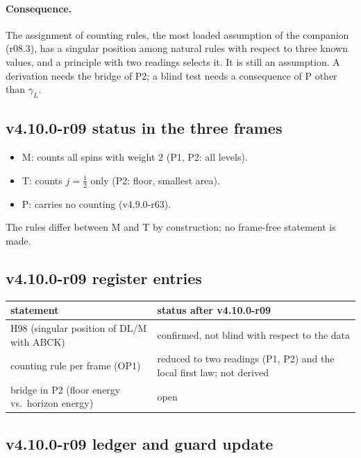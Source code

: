 \paragraph{Consequence.}
The assignment of counting rules, the most loaded assumption of the companion (r08.3), has a singular position among natural rules with respect to
three known values, and a principle with two readings selects it.  It is still an assumption.  A derivation needs the bridge of P2; a blind test needs a
consequence of P other than \(\gamma_L\).

\subsection*{v4.10.0-r09 status in the three frames}
\label{subsec:v4100-r09-frames}

\begin{itemize}[leftmargin=2em]
\item M: counts all spins with weight \(2\) (P1, P2: all levels).
\item T: counts \(j=\tfrac12\) only (P2: floor, smallest area).
\item P: carries no counting (v4.9.0-r63).
\end{itemize}
The rules differ between M and T by construction; no frame-free statement is made.

\subsection*{v4.10.0-r09 register entries}
\label{subsec:v4100-r09-register}

\begin{center}
\small
\begin{tabular}{@{}>{\raggedright\arraybackslash}p{}>{\raggedright\arraybackslash}p{}@{}}
\toprule
statement & status after v4.10.0-r09\\
\midrule
H98 (singular position of DL/M with ABCK) & confirmed, not blind with respect to the data\\
counting rule per frame (OP1) & reduced to two readings (P1, P2) and the local first law; not derived\\
bridge in P2 (floor energy vs.\ horizon energy) & open\\
\bottomrule
\end{tabular}
\end{center}

\subsection*{v4.10.0-r09 ledger and guard update}
\label{subsec:v4100-r09-ledger-guard}

